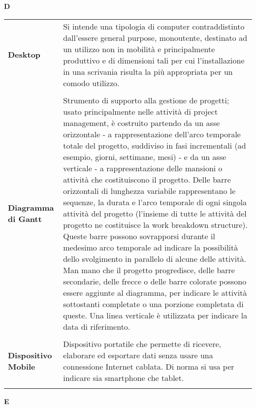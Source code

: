 {} 
\hfill\Huge{\textbf{D}} \\ 
\normalsize 
\begin{longtable}{L{4cm} p{10cm}}
\textbf{Desktop} & Si intende una tipologia di computer contraddistinto dall’essere general purpose, monoutente, destinato ad un utilizzo non in mobilità e principalmente produttivo e di dimensioni tali per cui l’installazione in una scrivania risulta la più appropriata per un comodo utilizzo. \\ 
 \\ 
\textbf{Diagramma di Gantt} & Strumento di supporto alla gestione de progetti; usato principalmente nelle attività di project management, è costruito partendo da un asse orizzontale - a rappresentazione dell'arco temporale totale del progetto, suddiviso in fasi incrementali (ad esempio, giorni, settimane, mesi) - e da un asse verticale - a rappresentazione delle mansioni o attività che costituiscono il progetto. Delle barre orizzontali di lunghezza variabile rappresentano le sequenze, la durata e l'arco temporale di ogni singola attività del progetto (l'insieme di tutte le attività del progetto ne costituisce la work breakdown structure). Queste barre possono sovrapporsi durante il medesimo arco temporale ad indicare la possibilità dello svolgimento in parallelo di alcune delle attività. Man mano che il progetto progredisce, delle barre secondarie, delle frecce o delle barre colorate possono essere aggiunte al diagramma, per indicare le attività sottostanti completate o una porzione completata di queste. Una linea verticale è utilizzata per indicare la data di riferimento. \\ 
 \\ 
\textbf{Dispositivo Mobile} & Dispositivo portatile che permette di ricevere, elaborare ed esportare dati senza usare una connessione Internet cablata. Di norma si usa per indicare sia smartphone che tablet. \\ 
 \\ 
\end{longtable} 
\newpage 
{} 
{} 
\hfill\Huge{\textbf{E}} \\ 
\normalsize 

